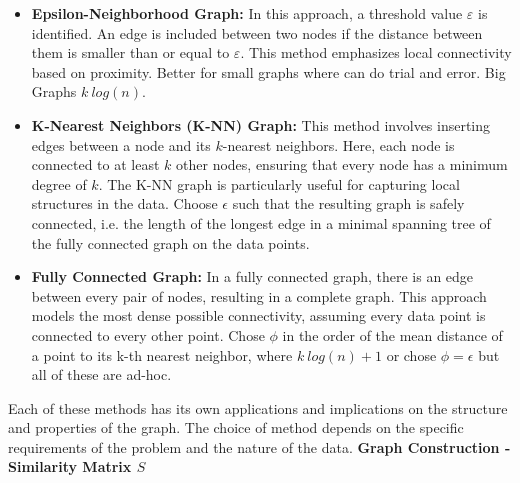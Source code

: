 \documentclass[unicode,11pt,a4paper,oneside,numbers=endperiod,openany]{scrartcl}
\begin{document}
\begin{itemize}
    \item \textbf{Epsilon-Neighborhood Graph:} In this approach, a threshold value \( \varepsilon \) is identified. An edge is included between two nodes if the distance between them is smaller than or equal to \( \varepsilon \). This method emphasizes local connectivity based on proximity.
    \newline
    Better for small graphs where can do trial and error. Big Graphs $k~log(n)$.

    \item \textbf{K-Nearest Neighbors (K-NN) Graph:} This method involves inserting edges between a node and its \( k \)-nearest neighbors. Here, each node is connected to at least \( k \) other nodes, ensuring that every node has a minimum degree of \( k \). The K-NN graph is particularly useful for capturing local structures in the data.\newline
    Choose $\epsilon$ such that the resulting graph is safely connected, i.e. the length of the longest edge in a minimal  spanning tree of the fully connected graph on the data points.

    \item \textbf{Fully Connected Graph:} In a fully connected graph, there is an edge between every pair of nodes, resulting in a complete graph. This approach models the most dense possible connectivity, assuming every data point is connected to every other point.
    \newline
    Chose $\phi$ in the order of the mean distance of a point to its k-th nearest neighbor, where $k~log(n)+1$ or chose $\phi = \epsilon$ but all of these are ad-hoc.
\end{itemize}

Each of these methods has its own applications and implications on the structure and properties of the graph. The choice of method depends on the specific requirements of the problem and the nature of the data.
\newline \newline
\textbf{Graph Construction - Similarity Matrix \( S \)}
\end{document}
